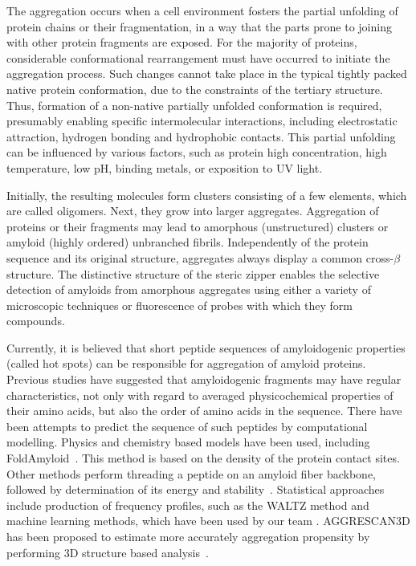 \documentclass[a4,center,fleqn]{NAR}
\begin{document}
  The aggregation occurs when a cell environment fosters the partial unfolding 
of protein chains or their fragmentation, in a way that the parts prone to 
joining with other protein fragments are exposed. For the majority of proteins, 
considerable conformational rearrangement must have occurred to initiate the 
aggregation process. Such changes cannot take place in the typical tightly 
packed native protein conformation, due to the constraints of the tertiary 
structure. Thus, formation of a non-native partially unfolded conformation is 
required, presumably enabling specific intermolecular interactions, including 
electrostatic attraction, hydrogen bonding and hydrophobic contacts. This 
partial unfolding can be influenced by various factors, such as protein high 
concentration, high temperature, low pH, binding metals, or exposition to UV 
light.

  Initially, the resulting molecules form clusters consisting of a few 
elements, which are called oligomers. Next, they grow into larger aggregates. 
Aggregation of proteins or their fragments may lead to amorphous (unstructured) 
clusters or amyloid (highly ordered) unbranched fibrils. Independently of the 
protein sequence and its original structure, aggregates always display a common 
cross-$\beta$ structure. The distinctive structure of the steric zipper enables 
the selective detection of amyloids from amorphous aggregates using either a 
variety of microscopic techniques or fluorescence of probes with which they form 
compounds.

    Currently, it is believed that short peptide sequences of amyloidogenic 
properties (called hot spots) can be responsible for aggregation of amyloid 
proteins.  Previous studies have suggested that amyloidogenic fragments may have 
regular characteristics, not only with regard to averaged physicochemical 
properties of their amino acids, but also the order of amino acids in the 
sequence. There have been attempts to predict the sequence of such peptides by 
computational modelling. Physics and chemistry based models have been used, 
including FoldAmyloid~\citep{garbuzynskiy_foldamyloid:_2010}. This method is 
based on the density of the protein contact sites. Other methods perform 
threading a peptide on an amyloid fiber backbone, followed by determination of 
its energy and stability~\citep{goldschmidt_identifying_2010, 
bryan_stitcher:_2012, odonnell_method_2011}. Statistical approaches include 
production of frequency profiles, such as the WALTZ method 
\citep{beerten_waltz-db:_2015} and machine learning methods, which have been 
used by our team \citep{stanislawski_machine_2013, gasior_fish_2014}. 
AGGRESCAN3D has been proposed to estimate more accurately aggregation propensity 
by performing 3D structure based analysis~\citep{zambrano_aggrescan3d_2015}. 
\end{document}
